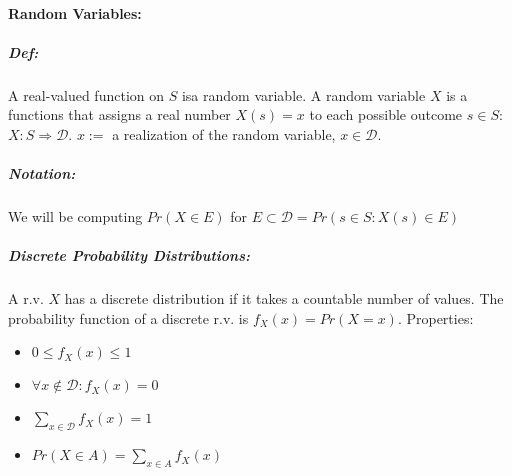 \documentclass{article}[10pt]
\begin{document}
\begin{multicols}{2}
        \paragraph*{Random Variables:}
            \subparagraph*{Def:}
                A real-valued function on $S$ isa  random variable. A random variable $X$ is a functions that assigns a real number $X(s)=x$ to each possible outcome $s \in S$: $X:S \Rightarrow \mathcal{D}$. $x:=$ a realization of the random variable, $x \in \mathcal{D}$.
            \subparagraph*{Notation: } 
                We will be computing $Pr(X \in E)$ for $E \subset \mathcal{D} = Pr(s \in S: X(s) \in E)$
            \subparagraph*{Discrete Probability Distributions: }
                A r.v. $X$ has a discrete distribution if it takes a countable number of values. The probability function of a discrete r.v. is $f_X(x) = Pr(X=x)$. Properties:

                \begin{itemize}
                    \item[] $0 \leq f_X(x) \leq 1$
                    \item[] $\forall x \notin \mathcal{D}: f_X(x) = 0$
                    \item[] $\sum\limits_{x \in \mathcal{D}} f_X(x) = 1$
                    \item[] $Pr(X \in A) = \sum\limits_{x \in A} f_X (x)$
                \end{itemize}


\end{multicols}
\end{document}
